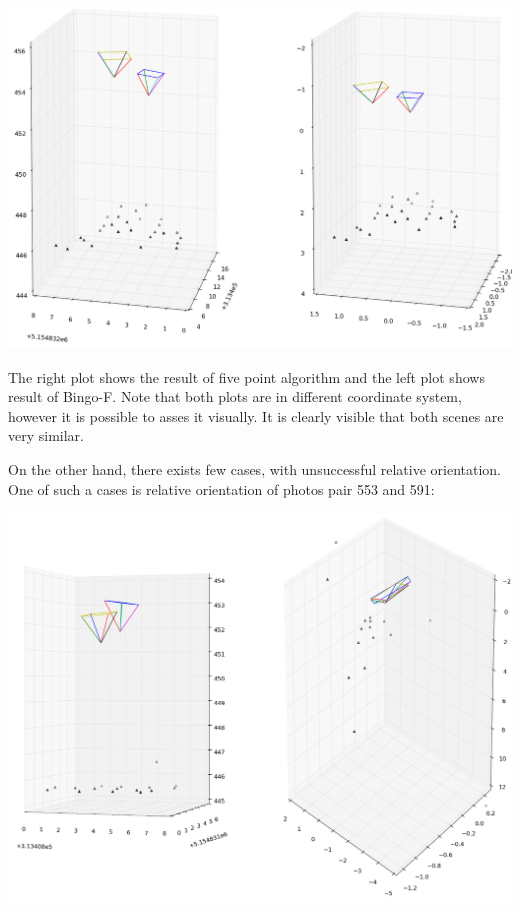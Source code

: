 \documentclass[a4paper,12pt]{article}
\begin{document}
\includegraphics[scale=0.4]{figures/rel_or_576_598.png}

The right plot shows the result of five point algorithm and the left plot shows result of Bingo-F. Note that both 
plots are in different coordinate system, however it is possible to asses it visually. It is clearly visible
that both scenes are very similar.

On the other hand, there exists  few cases, with unsuccessful relative orientation.  
One of such a cases is relative orientation of photos pair 553 and 591:  


\includegraphics[scale=0.4]{figures/rel_or_553_591.png}
\end{document}
